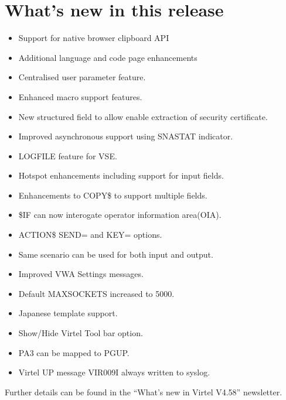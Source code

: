 \documentclass[letterpaper,10pt,english]{sphinxmanual}
\begin{document}
\chapter{What’s new in this release}
\label{\detokenize{Migration_Guide:what-s-new-in-this-release}}\label{\detokenize{Migration_Guide:index-9}}
\begin{itemize}
\item {} 
Support for native browser clipboard API

\item {} 
Additional language and code page enhancements

\item {} 
Centralised user parameter feature.

\item {} 
Enhanced macro support features.

\item {} 
New structured field to allow enable extraction of security certificate.

\item {} 
Improved asynchronous support using SNASTAT indicator.

\item {} 
LOGFILE feature for VSE.

\item {} 
Hotspot enhancements including support for input fields.

\end{itemize}

\begin{itemize}
\item {} 
Enhancements to COPY\$ to support multiple fields.

\item {} 
\$IF can now interogate operator information area(OIA).

\item {} 
ACTION\$ SEND= and KEY= options.

\item {} 
Same scenario can be used for both input and output.

\end{itemize}

\begin{itemize}
\item {} 
Improved VWA Settings messages.

\item {} 
Default MAXSOCKETS increased to 5000.

\item {} 
Japanese template support.

\item {} 
Show/Hide Virtel Tool bar option.

\item {} 
PA3 can be mapped to PGUP.

\item {} 
Virtel UP message VIR009I always written to syslog.

\end{itemize}

Further details can be found in the “What’s new in Virtel V4.58” newsletter.



\renewcommand{\indexname}{Index}
\printindex
\end{document}
